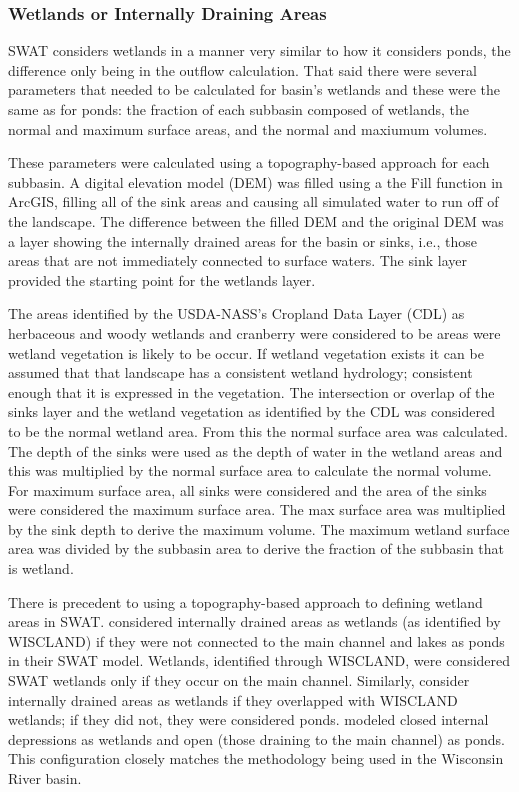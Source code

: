 \subsubsection{Wetlands or Internally Draining Areas}

	SWAT considers wetlands in a manner very similar to how it considers ponds, the difference only being in the outflow calculation. That said there were several parameters that needed to be calculated for basin's wetlands and these were the same as for ponds: the fraction of each subbasin composed of wetlands, the normal and maximum surface areas, and the normal and maxiumum volumes. 
	
	These parameters were calculated using a topography-based approach for each subbasin. A digital elevation model (DEM) was filled using a the Fill function in ArcGIS, filling all of the sink areas and causing all simulated water to run off of the landscape. The difference between the filled DEM and the original DEM was a layer showing the internally drained areas for the basin or sinks, i.e., those areas that are not immediately connected to surface waters. The sink layer provided the starting point for the wetlands layer. 
	
	The areas identified by the USDA-NASS's Cropland Data Layer (CDL) as herbaceous and woody wetlands and cranberry were considered to be areas were wetland vegetation is likely to be occur. If wetland vegetation exists it can be assumed that that landscape has a consistent wetland hydrology; consistent enough that it is expressed in the vegetation. The intersection or overlap of the sinks layer and the wetland vegetation as identified by the CDL was considered to be the normal wetland area. From this the normal surface area was calculated. The depth of the sinks were used as the depth of water in the wetland areas and this was multiplied by the normal surface area to calculate the normal volume. For maximum surface area, all sinks were considered and the area of the sinks were considered the maximum surface area. The max surface area was multiplied by the sink depth to derive the maximum volume. The maximum wetland surface area was divided by the subbasin area to derive the fraction of the subbasin that is wetland.
	
	There is precedent to using a topography-based approach to defining wetland areas in SWAT. \citet{almendinger_constructing_2007} considered internally drained areas as wetlands (as identified by WISCLAND) if they were not connected to the main channel and lakes as ponds in their SWAT model. Wetlands, identified through WISCLAND, were considered SWAT wetlands only if they occur on the main channel. Similarly, \citet{kirsch_predicting_2002} consider internally drained areas as wetlands if they overlapped with WISCLAND wetlands; if they did not, they were considered ponds.  \citet{almendinger_constructing_2010} modeled closed internal depressions as wetlands and open (those draining to the main channel) as ponds. This configuration closely matches the methodology being used in the Wisconsin River basin.







